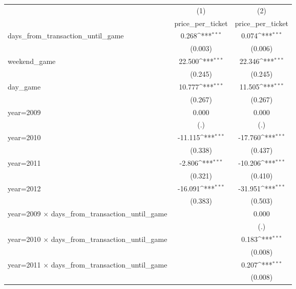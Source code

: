 {
\def\sym#1{\ifmmode^{#1}\else\(^{#1}\)\fi}
\begin{tabular}{l*{2}{c}}
\hline\hline
                    &\multicolumn{1}{c}{(1)}&\multicolumn{1}{c}{(2)}\\
                    &\multicolumn{1}{c}{price\_per\_ticket}&\multicolumn{1}{c}{price\_per\_ticket}\\
\hline
days\_from\_transaction\_until\_game&       0.268\sym{***}&       0.074\sym{***}\\
                    &     (0.003)         &     (0.006)         \\
[1em]
weekend\_game        &      22.500\sym{***}&      22.346\sym{***}\\
                    &     (0.245)         &     (0.245)         \\
[1em]
day\_game            &      10.777\sym{***}&      11.505\sym{***}\\
                    &     (0.267)         &     (0.267)         \\
[1em]
year=2009           &       0.000         &       0.000         \\
                    &         (.)         &         (.)         \\
[1em]
year=2010           &     -11.115\sym{***}&     -17.760\sym{***}\\
                    &     (0.338)         &     (0.437)         \\
[1em]
year=2011           &      -2.806\sym{***}&     -10.206\sym{***}\\
                    &     (0.321)         &     (0.410)         \\
[1em]
year=2012           &     -16.091\sym{***}&     -31.951\sym{***}\\
                    &     (0.383)         &     (0.503)         \\
[1em]
year=2009 $\times$ days\_from\_transaction\_until\_game&                     &       0.000         \\
                    &                     &         (.)         \\
[1em]
year=2010 $\times$ days\_from\_transaction\_until\_game&                     &       0.183\sym{***}\\
                    &                     &     (0.008)         \\
[1em]
year=2011 $\times$ days\_from\_transaction\_until\_game&                     &       0.207\sym{***}\\
                    &                     &     (0.008)         \\

\end{tabular}}
